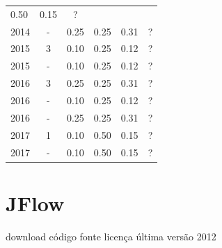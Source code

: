\begin{table}[H]
\begin{tabular}{| l | c | c | c | c | c |}
          0.50
          &
            {\color{red} 0.15}
          &
          ?
          \\
            2014
          &
          -
          &
          0.25
          &
          0.25
          &
            {\color{red} 0.31}
          &
          ?
          \\
\hline
            2015
          &
          3
          &
          0.10
          &
          0.25
          &
            {\color{red} 0.12}
          &
          ?
          \\
            2015
          &
          -
          &
          0.10
          &
          0.25
          &
            {\color{red} 0.12}
          &
          ?
          \\
\hline
            2016
          &
          3
          &
          0.25
          &
          0.25
          &
            {\color{red} 0.31}
          &
          ?
          \\
            2016
          &
          -
          &
          0.10
          &
          0.25
          &
            {\color{red} 0.12}
          &
          ?
          \\
            2016
          &
          -
          &
          0.25
          &
          0.25
          &
            {\color{red} 0.31}
          &
          ?
          \\
\hline
            2017
          &
          1
          &
          0.10
          &
          0.50
          &
            {\color{red} 0.15}
          &
          ?
          \\
            2017
          &
          -
          &
          0.10
          &
          0.50
          &
            {\color{red} 0.15}
          &
          ?
          \\
\hline
\end{tabular}
\end{table}



\section{JFlow}
\checkmark download
\checkmark código fonte
\checkmark licença
\checkmark última versão 2012



